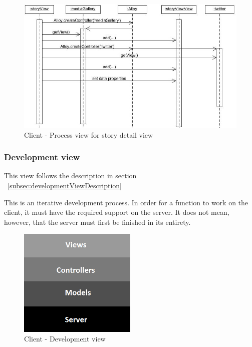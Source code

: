 \documentclass[11pt]{book}
\begin{document}
\begin{figure}[H]
      \centering
      \includegraphics[width=1.0\textwidth]{Figures/Architecture/Sequence/client/storyView.jpg}
      \caption{Client - Process view for story detail view}
      \label{fig:arch_client_process_storyDetail}
\end{figure}


\subsubsection{Development view}
This view follows the description in section ~\ref{subsec:developmentViewDescription}

This is an iterative development process. In order for a function to work on the client, it must have the required support on the server. It does not mean, however, that the server must first be finished in its entirety.

\begin{figure}[H]
      \centering
      \includegraphics[width=0.5\textwidth]{Figures/Architecture/clientDevelopmentView.png}
      \caption{Client - Development view}
      \label{fig:arch_client_development}
\end{figure}
\end{document}
